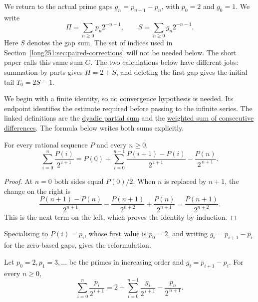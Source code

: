 \documentclass[11pt]{article}
\makeatletter
\newcommand{\compatlabel}[1]{\ltx@label{#1}}
\makeatother
\begin{document}
We return to the actual prime gaps
$g_n=p_{n+1}-p_n$, with $p_0=2$ and $g_0=1$.  We write
\[
 \Pi=\sum_{n\ge0}p_n2^{-n-1},\qquad
 S=\sum_{n\ge0}g_n2^{-n-1}.
\]
Here $S$ denotes the gap sum.  The set of indices used in
Section~\ref{long251:sec:paired-corrections} will not be needed below.
The short paper calls this same sum $G$.  The two calculations below
have different jobs: summation by parts gives $\Pi=2+S$, and deleting
the first gap gives the initial tail $T_0=2S-1$.

We begin with a finite identity, so no convergence hypothesis is needed.
Its endpoint identifies the estimate required before passing to the
infinite series.  The linked definitions are the
\href{https://github.com/wcook04/plectis-erdos/blob/3d6d938d696fed0fb71dd55115a18a73738ff223/lean/ErdosProblems/Erdos251/PrimeGapDyadicTail.lean\#L101}{dyadic partial sum}
and the
\href{https://github.com/wcook04/plectis-erdos/blob/3d6d938d696fed0fb71dd55115a18a73738ff223/lean/ErdosProblems/Erdos251/PrimeGapDyadicTail.lean\#L121}{weighted sum of consecutive differences}.
The formula below writes both sums explicitly.

\begin{proposition}\label{long251:res:abel}\compatlabel{res:abel}
For every rational sequence $P$ and every $n\ge0$,
\[
 \sum_{i=0}^{n}\frac{P(i)}{2^{\,i+1}}
 =P(0)+\sum_{i=0}^{n-1}\frac{P(i+1)-P(i)}{2^{\,i+1}}
       -\frac{P(n)}{2^{\,n+1}} .
\]
\end{proposition}

\begin{proof}
At $n=0$ both sides equal $P(0)/2$.  When $n$ is replaced by $n+1$,
the change on the right is
\[
 \frac{P(n+1)-P(n)}{2^{n+1}}
 -\frac{P(n+1)}{2^{n+2}}+\frac{P(n)}{2^{n+1}}
 =\frac{P(n+1)}{2^{n+2}}.
\]
This is the next term on the left, which proves the identity by induction.
\end{proof}

Specialising to $P(i)=p_i$, whose first value is $p_0=2$, and writing
$g_i=p_{i+1}-p_i$ for the zero-based gaps, gives the reformulation.

\begin{theorem}\label{long251:res:parts}\compatlabel{res:parts}
Let $p_0=2,p_1=3,\ldots$ be the primes in increasing order and
$g_i=p_{i+1}-p_i$.  For every $n\ge0$,
\[
 \sum_{i=0}^{n}\frac{p_i}{2^{\,i+1}}
 =2+\sum_{i=0}^{n-1}\frac{g_i}{2^{\,i+1}}-\frac{p_n}{2^{\,n+1}} .
\]
\end{theorem}
\end{document}
